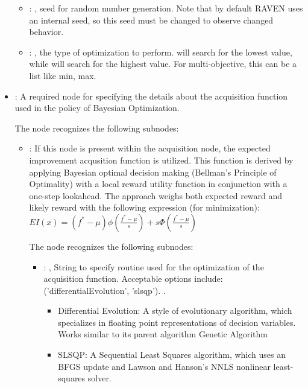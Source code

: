 \begin{itemize}
\begin{itemize}
        \item {}: ,
          seed for random number generation. Note that by default RAVEN uses an internal seed,
          so this seed must be changed to observe changed behavior. 

        \item {}: ,
          the type of optimization to perform.  will search for the lowest
           value, while  will search for the highest value.
          For multi-objective, this can be a list like min, max.
      \end{itemize}

    \item {}:
      A required node for specifying                                                           the
      details about the acquisition function
      used in the policy of Bayesian Optimization.

      The  node recognizes the following subnodes:
      \begin{itemize}
        \item {}:
          If this node is present within the acquisition node,                         the expected
          improvement acqusition function is utilized.                         This function is
          derived by applying Bayesian optimal decision making (Bellman's Principle of Optimality)
          with a local reward utility function in conjunction with a one-step lookahead.
          The approach weighs both expected reward and likely reward with the
          following expression (for minimization):                         $EI(x) =
          (f^*-\mu)\phi(\frac{f^*-\mu}{s}) + s \Phi(\frac{f^*-\mu}{s})$

          The  node recognizes the following subnodes:
          \begin{itemize}
            \item {}: ,
              String to specify routine used for the optimization of the acquisition function.
              Acceptable options include: ('differentialEvolution', 'slsqp').
              .
              \begin{itemize}                                                  \item Differential
              Evolution: A style of evolutionary algorithm, which specializes in floating point
              representations of decision variables. Works similar to its parent algorithm Genetic
              Algorithm                                                  \item SLSQP: A Sequential
              Least Squares algorithm, which uses an BFGS update and
              Lawson and Hanson’s NNLS nonlinear least-squares solver.
              \end{itemize}


\end{itemize}
\end{itemize}
\end{itemize}
